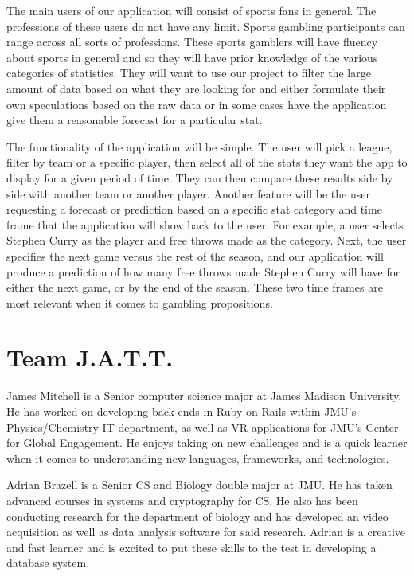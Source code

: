\documentclass[11pt]{article}
\begin{document}
The main users of our application will consist of sports fans in general. The professions of these users do not have any limit. Sports gambling participants can range across all sorts of professions. These sports gamblers will have fluency about sports in general and so they will have prior knowledge of the various categories of statistics. They will want to use our project to filter the large amount of data based on what they are looking for and either formulate their own speculations based on the raw data or in some cases have the application give them a reasonable forecast for a particular stat.

The functionality of the application will be simple. The user will pick a league, filter by team or a specific player, then select all of the stats they want the app to display for a given period of time. They can then compare these results side by side with another team or another player. Another feature will be the user requesting a forecast or prediction based on a specific stat category and time frame that the application will show back to the user. For example, a user selects Stephen Curry as the player and free throws made as the category. Next, the user specifies the next game versus the rest of the season, and our application will produce a prediction of how many free throws made Stephen Curry will have for either the next game, or by the end of the season. These two time frames are most relevant when it comes to gambling propositions.

\section*{Team J.A.T.T.}

James Mitchell is a Senior computer science major at James Madison University. He has worked on developing back-ends in Ruby on Rails within JMU’s Physics/Chemistry IT department, as well as VR applications for JMU’s Center for Global Engagement. He enjoys taking on new challenges and is a quick learner when it comes to understanding new languages, frameworks, and technologies.

Adrian Brazell is a Senior CS and Biology double major at JMU. He has taken advanced courses in systems and cryptography for CS. He also has been conducting research for the department of biology and has developed an video acquisition as well as data analysis software for said research. Adrian is a creative and fast learner and is excited to put these skills to the test in developing a database system. 
\end{document}
